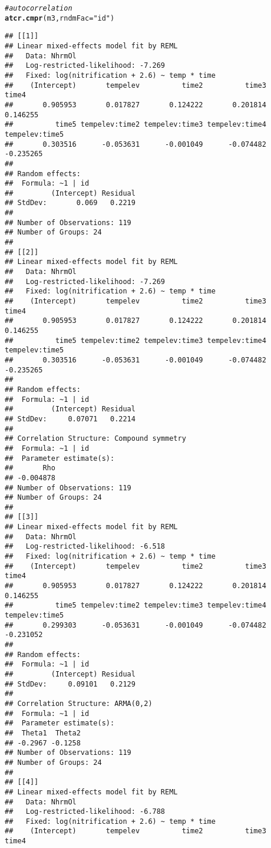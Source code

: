 \documentclass[11pt]{article}\usepackage[]{graphicx}\usepackage[]{color}
\makeatletter
\newcommand{\hlstr}[1]{\textcolor[rgb]{0.192,0.494,0.8}{#1}}%
\newcommand{\hlcom}[1]{\textcolor[rgb]{0.678,0.584,0.686}{\textit{#1}}}%
\newcommand{\hlstd}[1]{\textcolor[rgb]{0.345,0.345,0.345}{#1}}%
\newcommand{\hlkwc}[1]{\textcolor[rgb]{0.333,0.667,0.333}{#1}}%
\newcommand{\hlkwd}[1]{\textcolor[rgb]{0.737,0.353,0.396}{\textbf{#1}}}%
\newenvironment{kframe}{%
 \def\at@end@of@kframe{}%
 \ifinner\ifhmode%
  \def\at@end@of@kframe{\end{minipage}}%
  \begin{minipage}{\columnwidth}%
 \fi\fi%
 \def\FrameCommand##1{\hskip\@totalleftmargin \hskip-\fboxsep
 \colorbox{shadecolor}{##1}\hskip-\fboxsep
     \hskip-\linewidth \hskip-\@totalleftmargin \hskip\columnwidth}%
 \MakeFramed {\advance\hsize-\width
   \@totalleftmargin\z@ \linewidth\hsize
   \@setminipage}}%
 {\par\unskip\endMakeFramed%
 \at@end@of@kframe}
\newenvironment{knitrout}{}{} %
\makeatother
\begin{document}
\begin{knitrout}
\begin{kframe}
\begin{alltt}
\hlcom{# autocorrelation}
\hlkwd{atcr.cmpr}\hlstd{(m3,} \hlkwc{rndmFac} \hlstd{=} \hlstr{"id"}\hlstd{)}
\end{alltt}
\begin{verbatim}
## [[1]]
## Linear mixed-effects model fit by REML
##   Data: NhrmOl 
##   Log-restricted-likelihood: -7.269
##   Fixed: log(nitrification + 2.6) ~ temp * time 
##    (Intercept)       tempelev          time2          time3          time4 
##       0.905953       0.017827       0.124222       0.201814       0.146255 
##          time5 tempelev:time2 tempelev:time3 tempelev:time4 tempelev:time5 
##       0.303516      -0.053631      -0.001049      -0.074482      -0.235265 
## 
## Random effects:
##  Formula: ~1 | id
##         (Intercept) Residual
## StdDev:       0.069   0.2219
## 
## Number of Observations: 119
## Number of Groups: 24 
## 
## [[2]]
## Linear mixed-effects model fit by REML
##   Data: NhrmOl 
##   Log-restricted-likelihood: -7.269
##   Fixed: log(nitrification + 2.6) ~ temp * time 
##    (Intercept)       tempelev          time2          time3          time4 
##       0.905953       0.017827       0.124222       0.201814       0.146255 
##          time5 tempelev:time2 tempelev:time3 tempelev:time4 tempelev:time5 
##       0.303516      -0.053631      -0.001049      -0.074482      -0.235265 
## 
## Random effects:
##  Formula: ~1 | id
##         (Intercept) Residual
## StdDev:     0.07071   0.2214
## 
## Correlation Structure: Compound symmetry
##  Formula: ~1 | id 
##  Parameter estimate(s):
##       Rho 
## -0.004878 
## Number of Observations: 119
## Number of Groups: 24 
## 
## [[3]]
## Linear mixed-effects model fit by REML
##   Data: NhrmOl 
##   Log-restricted-likelihood: -6.518
##   Fixed: log(nitrification + 2.6) ~ temp * time 
##    (Intercept)       tempelev          time2          time3          time4 
##       0.905953       0.017827       0.124222       0.201814       0.146255 
##          time5 tempelev:time2 tempelev:time3 tempelev:time4 tempelev:time5 
##       0.299303      -0.053631      -0.001049      -0.074482      -0.231052 
## 
## Random effects:
##  Formula: ~1 | id
##         (Intercept) Residual
## StdDev:     0.09101   0.2129
## 
## Correlation Structure: ARMA(0,2)
##  Formula: ~1 | id 
##  Parameter estimate(s):
##  Theta1  Theta2 
## -0.2967 -0.1258 
## Number of Observations: 119
## Number of Groups: 24 
## 
## [[4]]
## Linear mixed-effects model fit by REML
##   Data: NhrmOl 
##   Log-restricted-likelihood: -6.788
##   Fixed: log(nitrification + 2.6) ~ temp * time 
##    (Intercept)       tempelev          time2          time3          time4 

\end{verbatim}
\end{kframe}
\end{knitrout}
\end{document}
